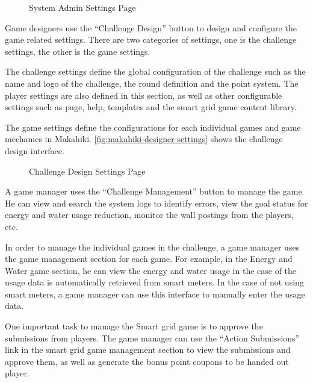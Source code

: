 \begin{figure}[!ht]
\begin{center}
\end{center}
\caption{System Admin Settings Page}
\label{fig:makahiki-sys-settings}
\end{figure}

\clearpage

Game designers use the ``Challenge Design'' button to design and configure the game related settings. There are two categories of settings, one is the challenge settings, the other is the game settings. 

The challenge settings define the global configuration of the challenge such as the name and logo of the challenge, the round definition and the point system. The player settings are also defined in this section, as well as other configurable settings such as page, help, templates and the smart grid game content library. 

The game settings define the configurations for each individual games and game mechanics in Makahiki. \autoref{fig:makahiki-designer-settings} shows the challenge design interface.

\begin{figure}[!ht]
\begin{center}
\end{center}
\caption{Challenge Design Settings Page}
\label{fig:makahiki-designer-settings}
\end{figure}

\clearpage

A game manager uses the ``Challenge Management'' button to manage the game. He can view and search the system logs to identify errors, view the goal status for energy and water usage reduction, monitor the wall postings from the players, etc. 

In order to manage the individual games in the challenge, a game manager uses the game management section for each game. For example, in the Energy and Water game section, he can view the energy and water usage in the case of the usage data is automatically retrieved from smart meters. In the case of not using smart meters, a game manager can use this interface to manually enter the usage data. 

One important task to manage the Smart grid game is to approve the submissions from players. The game manager can use the ``Action Submissions'' link in the smart grid game management section to view the submissions and approve them, as well as generate the bonus point coupons to be handed out player. 

